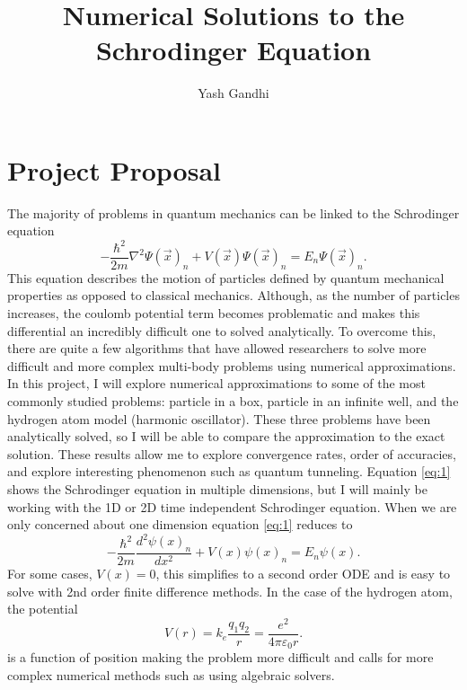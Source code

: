 \documentclass{article}
\title{Numerical Solutions to the Schrodinger Equation}
\author{Yash Gandhi}
\begin{document}
    \maketitle
    
    \section{Project Proposal}
    The majority of problems in quantum mechanics can be linked to the Schrodinger equation
    \begin{equation} \label{eq:1}
        -\frac{\hbar^2}{2m} \nabla^2\Psi(\vec{x})_n + V(\vec{x})\Psi(\vec{x})_n = E_n\Psi(\vec{x})_n.
    \end{equation}
    This equation describes the motion of particles defined by quantum mechanical properties as
    opposed to classical mechanics. Although, as the number of particles increases, the coulomb potential
    term becomes problematic and makes this differential an incredibly difficult one to solved
    analytically. To overcome this, there are quite a few algorithms that have allowed researchers
    to solve more difficult and more complex multi-body problems using numerical approximations.
    In this project, I will explore numerical approximations to some of the most commonly studied 
    problems: particle in a box, particle in an infinite well, and the hydrogen atom model (harmonic
    oscillator). These three problems have been analytically solved, so I will be able to compare 
    the approximation to the exact solution. These results allow me to explore convergence rates, 
    order of accuracies, and explore interesting phenomenon such as quantum tunneling. Equation \ref{eq:1}
    shows the Schrodinger equation in multiple dimensions, but I will mainly be working with the 1D or 
    2D time independent Schrodinger equation. When we are only concerned about one dimension 
    equation \ref{eq:1} reduces to
    \begin{equation}\label{eq:2}
        -\frac{\hbar^2}{2m} \frac{d^2\psi(x)_n}{dx^2} + V(x)\psi(x)_n = E_n\psi(x). 
    \end{equation}
    For some cases, $V(x) = 0$, this simplifies to a second order ODE and is easy to solve with 2nd order 
    finite difference methods. In the case of the hydrogen atom, the potential 
    \begin{equation}\label{eq:3}
        V(r) = k_e\frac{q_1q_2}{r} = \frac{e^2}{4\pi\varepsilon_0 r}.
    \end{equation} 
    is a function of position making the problem more difficult and calls for more complex numerical 
    methods such as using algebraic solvers.
    
    



    
\end{document}

